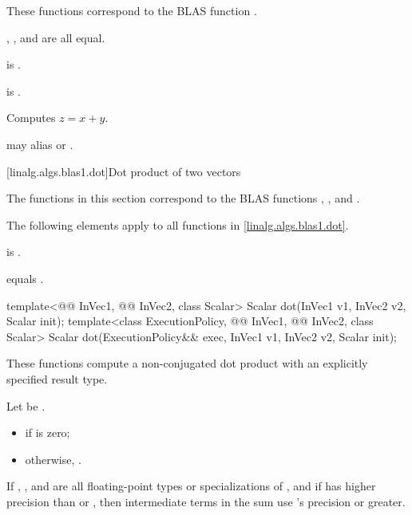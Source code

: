 \begin{itemdescr}
\pnum
\begin{note}
These functions correspond to the BLAS function \supercite{blas1}.
\end{note}

\pnum
\constraints
{}, , and  are all equal.

\pnum
\mandates
{} is .

\pnum
\expects
{} is .

\pnum
\effects
Computes $z = x + y$.

\pnum
\remarks
{} may alias  or .
\end{itemdescr}

[linalg.algs.blas1.dot]{Dot product of two vectors}

\pnum
\begin{note}
The functions in this section correspond to the BLAS
functions , , and \supercite{blas1}.
\end{note}

\pnum
The following elements apply to all functions in \ref{linalg.algs.blas1.dot}.

\pnum
\mandates
{} is .

\pnum
\expects
{} equals .
\begin{itemdecl}
template<@@ InVec1, @@ InVec2, class Scalar>
  Scalar dot(InVec1 v1, InVec2 v2, Scalar init);
template<class ExecutionPolicy, @@ InVec1, @@ InVec2, class Scalar>
  Scalar dot(ExecutionPolicy&& exec,
             InVec1 v1, InVec2 v2, Scalar init);
\end{itemdecl}

\begin{itemdescr}
\pnum
These functions compute a non-conjugated dot product
with an explicitly specified result type.

\pnum
\returns
Let  be .
\begin{itemize}
\item
{} if  is zero;
\item
otherwise,
.
\end{itemize}

\pnum
\remarks
If , , and 
are all floating-point types or specializations of ,
and if  has higher precision
than  or ,
then intermediate terms in the sum use 's precision or greater.
\end{itemdescr}

